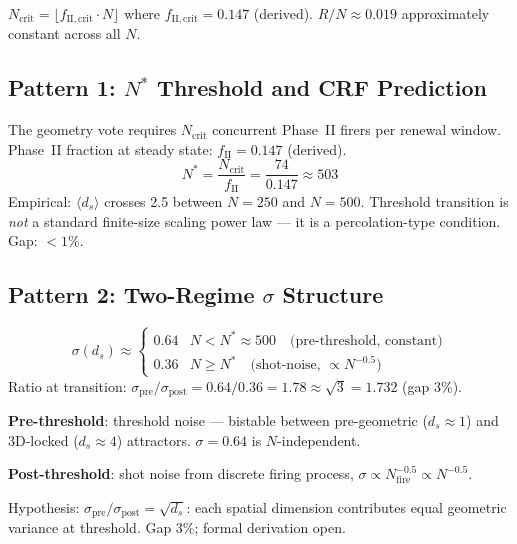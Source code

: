 \documentclass[12pt, a4paper]{article}
\begin{document}
$N_{\mathrm{crit}} = \lfloor f_{\mathrm{II,crit}}\cdot N\rfloor$ where $f_{\mathrm{II,crit}}=0.147$ (derived).
$R/N\approx 0.019$ approximately constant across all $N$.

\subsection{Pattern 1: $N^*$ Threshold and CRF Prediction}

\begin{derivedbox}[title={$N^*\approx 503$ from $\delta$-Chain}]
The geometry vote requires $N_{\mathrm{crit}}$ concurrent Phase~II firers per renewal window.
Phase~II fraction at steady state: $f_{\mathrm{II}}=0.147$ (derived).
\[
  N^* = \frac{N_{\mathrm{crit}}}{f_{\mathrm{II}}} = \frac{74}{0.147} \approx 503
\]
Empirical: $\langle d_s\rangle$ crosses 2.5 between $N=250$ and $N=500$.
Threshold transition is \emph{not} a standard finite-size scaling power law --- it is a percolation-type condition. Gap: $<1\%$.
\end{derivedbox}

\subsection{Pattern 2: Two-Regime $\sigma$ Structure}

\begin{derivedbox}[title={Two-Regime $\sigma$ Transition (Confirmed)}]
\[
  \sigma(d_s) \approx \begin{cases}
    0.64 & N < N^*\approx 500 \quad\text{(pre-threshold, constant)}\\
    0.36 & N \geq N^*\quad\text{(shot-noise, $\propto N^{-0.5}$)}
  \end{cases}
\]
Ratio at transition: $\sigma_{\mathrm{pre}}/\sigma_{\mathrm{post}} = 0.64/0.36 = 1.78 \approx \sqrt{3} = 1.732$ (gap 3\%).

\textbf{Pre-threshold}: threshold noise --- bistable between pre-geometric ($d_s\approx 1$) and 3D-locked ($d_s\approx 4$) attractors. $\sigma=0.64$ is $N$-independent.

\textbf{Post-threshold}: shot noise from discrete firing process, $\sigma\propto N_{\mathrm{fire}}^{-0.5}\propto N^{-0.5}$.

Hypothesis: $\sigma_{\mathrm{pre}}/\sigma_{\mathrm{post}} = \sqrt{d_s}$: each spatial dimension contributes equal geometric variance at threshold. Gap 3\%; formal derivation open.
\end{derivedbox}
\end{document}
